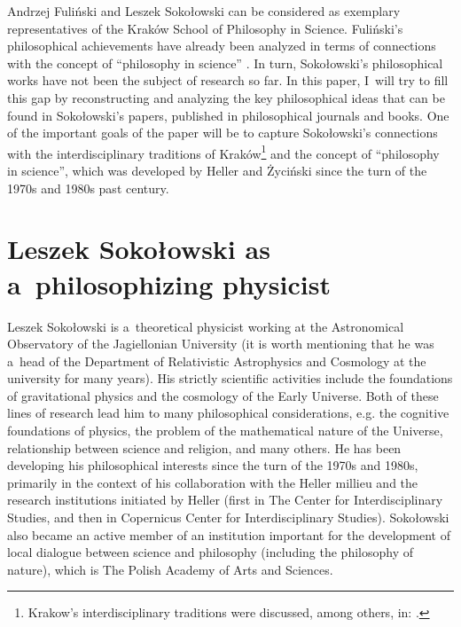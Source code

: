 \documentclass[%
  manuscript=article,
  year=2024,
  volume=77,
  doi=00000.000,
]{zfn}
\begin{document}
Andrzej Fuliński and Leszek Sokołowski can be considered as exemplary representatives of the Kraków School of Philosophy in Science. Fuliński's philosophical achievements have already been analyzed in terms of connections with the concept of ``philosophy in science'' 
\parencite[][]{Trombik2023Andrzej}. %
 In turn, Sokołowski's philosophical works have not been the subject of research so far. In this paper, I~will try to fill this gap by reconstructing and analyzing the key philosophical ideas that can be found in Sokołowski's papers, published in philosophical journals and books. One of the important goals of the paper will be to capture Sokołowski's connections with the interdisciplinary traditions of Kraków\footnote{Krakow's interdisciplinary traditions were discussed, among others, in: 
\parencites[][]{Polak201119th}[][]{Polak2018Tradycja}.%
} and the concept of ``philosophy in science'', which was developed by Heller and Życiński since the turn of the 1970s and 1980s past century.



\section{Leszek Sokołowski as a~philosophizing physicist}

Leszek Sokołowski is a~theoretical physicist working at the Astronomical Observatory of the Jagiellonian University (it is worth mentioning that he was a~head of the Department of Relativistic Astrophysics and Cosmology at the university for many years). His strictly scientific activities include the foundations of gravitational physics and the cosmology of the Early Universe. Both of these lines of research lead him to many philosophical considerations, e.g. the cognitive foundations of physics, the problem of the mathematical nature of the Universe, relationship between science and religion, and many others. He has been developing his philosophical interests since the turn of the 1970s and 1980s, primarily in the context of his collaboration with the Heller millieu and the research institutions initiated by Heller (first in The Center for Interdisciplinary Studies, and then in Copernicus Center for Interdisciplinary Studies). Sokołowski also became an active member of an institution important for the development of local dialogue between science and philosophy (including the philosophy of nature), which is The Polish Academy of Arts and Sciences.
\end{document}
